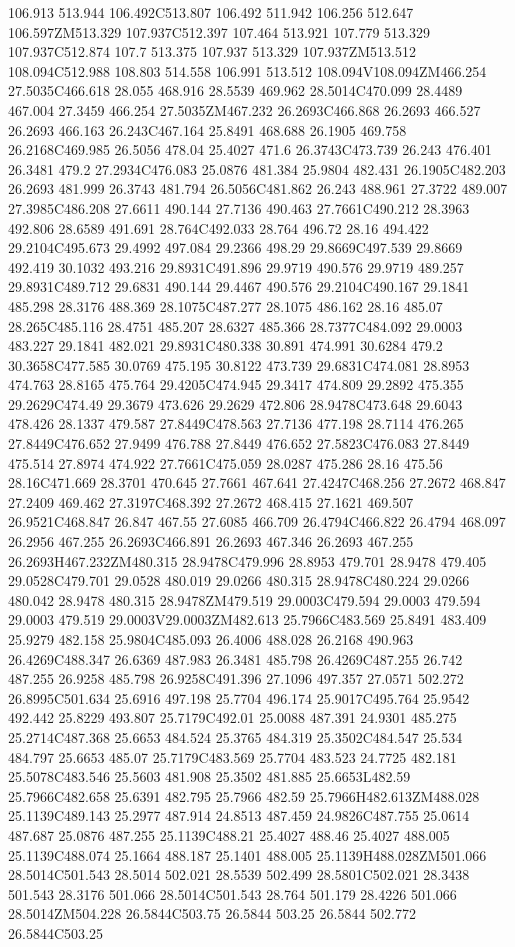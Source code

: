 106.913 513.944 106.492C513.807 106.492 511.942 106.256 512.647 106.597ZM513.329 107.937C512.397 107.464 513.921 107.779 513.329 107.937C512.874 107.7 513.375 107.937 513.329 107.937ZM513.512 108.094C512.988 108.803 514.558 106.991 513.512 108.094V108.094ZM466.254 27.5035C466.618 28.055 468.916 28.5539 469.962 28.5014C470.099 28.4489 467.004 27.3459 466.254 27.5035ZM467.232 26.2693C466.868 26.2693 466.527 26.2693 466.163 26.243C467.164 25.8491 468.688 26.1905 469.758 26.2168C469.985 26.5056 478.04 25.4027 471.6 26.3743C473.739 26.243 476.401 26.3481 479.2 27.2934C476.083 25.0876 481.384 25.9804 482.431 26.1905C482.203 26.2693 481.999 26.3743 481.794 26.5056C481.862 26.243 488.961 27.3722 489.007 27.3985C486.208 27.6611 490.144 27.7136 490.463 27.7661C490.212 28.3963 492.806 28.6589 491.691 28.764C492.033 28.764 496.72 28.16 494.422 29.2104C495.673 29.4992 497.084 29.2366 498.29 29.8669C497.539 29.8669 492.419 30.1032 493.216 29.8931C491.896 29.9719 490.576 29.9719 489.257 29.8931C489.712 29.6831 490.144 29.4467 490.576 29.2104C490.167 29.1841 485.298 28.3176 488.369 28.1075C487.277 28.1075 486.162 28.16 485.07 28.265C485.116 28.4751 485.207 28.6327 485.366 28.7377C484.092 29.0003 483.227 29.1841 482.021 29.8931C480.338 30.891 474.991 30.6284 479.2 30.3658C477.585 30.0769 475.195 30.8122 473.739 29.6831C474.081 28.8953 474.763 28.8165 475.764 29.4205C474.945 29.3417 474.809 29.2892 475.355 29.2629C474.49 29.3679 473.626 29.2629 472.806 28.9478C473.648 29.6043 478.426 28.1337 479.587 27.8449C478.563 27.7136 477.198 28.7114 476.265 27.8449C476.652 27.9499 476.788 27.8449 476.652 27.5823C476.083 27.8449 475.514 27.8974 474.922 27.7661C475.059 28.0287 475.286 28.16 475.56 28.16C471.669 28.3701 470.645 27.7661 467.641 27.4247C468.256 27.2672 468.847 27.2409 469.462 27.3197C468.392 27.2672 468.415 27.1621 469.507 26.9521C468.847 26.847 467.55 27.6085 466.709 26.4794C466.822 26.4794 468.097 26.2956 467.255 26.2693C466.891 26.2693 467.346 26.2693 467.255 26.2693H467.232ZM480.315 28.9478C479.996 28.8953 479.701 28.9478 479.405 29.0528C479.701 29.0528 480.019 29.0266 480.315 28.9478C480.224 29.0266 480.042 28.9478 480.315 28.9478ZM479.519 29.0003C479.594 29.0003 479.594 29.0003 479.519 29.0003V29.0003ZM482.613 25.7966C483.569 25.8491 483.409 25.9279 482.158 25.9804C485.093 26.4006 488.028 26.2168 490.963 26.4269C488.347 26.6369 487.983 26.3481 485.798 26.4269C487.255 26.742 487.255 26.9258 485.798 26.9258C491.396 27.1096 497.357 27.0571 502.272 26.8995C501.634 25.6916 497.198 25.7704 496.174 25.9017C495.764 25.9542 492.442 25.8229 493.807 25.7179C492.01 25.0088 487.391 24.9301 485.275 25.2714C487.368 25.6653 484.524 25.3765 484.319 25.3502C484.547 25.534 484.797 25.6653 485.07 25.7179C483.569 25.7704 483.523 24.7725 482.181 25.5078C483.546 25.5603 481.908 25.3502 481.885 25.6653L482.59 25.7966C482.658 25.6391 482.795 25.7966 482.59 25.7966H482.613ZM488.028 25.1139C489.143 25.2977 487.914 24.8513 487.459 24.9826C487.755 25.0614 487.687 25.0876 487.255 25.1139C488.21 25.4027 488.46 25.4027 488.005 25.1139C488.074 25.1664 488.187 25.1401 488.005 25.1139H488.028ZM501.066 28.5014C501.543 28.5014 502.021 28.5539 502.499 28.5801C502.021 28.3438 501.543 28.3176 501.066 28.5014C501.543 28.764 501.179 28.4226 501.066 28.5014ZM504.228 26.5844C503.75 26.5844 503.25 26.5844 502.772 26.5844C503.25 